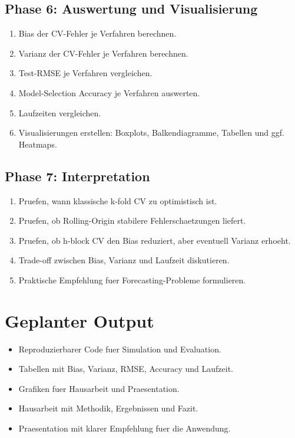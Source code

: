 \documentclass[11pt,a4paper]{article}
\begin{document}
\subsection{Phase 6: Auswertung und Visualisierung}

\begin{enumerate}
  \item Bias der CV-Fehler je Verfahren berechnen.
  \item Varianz der CV-Fehler je Verfahren berechnen.
  \item Test-RMSE je Verfahren vergleichen.
  \item Model-Selection Accuracy je Verfahren auswerten.
  \item Laufzeiten vergleichen.
  \item Visualisierungen erstellen:
  Boxplots, Balkendiagramme, Tabellen und ggf. Heatmaps.
\end{enumerate}

\subsection{Phase 7: Interpretation}

\begin{enumerate}
  \item Pruefen, wann klassische k-fold CV zu optimistisch ist.
  \item Pruefen, ob Rolling-Origin stabilere Fehlerschaetzungen liefert.
  \item Pruefen, ob h-block CV den Bias reduziert, aber eventuell Varianz erhoeht.
  \item Trade-off zwischen Bias, Varianz und Laufzeit diskutieren.
  \item Praktische Empfehlung fuer Forecasting-Probleme formulieren.
\end{enumerate}

\section{Geplanter Output}

\begin{itemize}
  \item Reproduzierbarer Code fuer Simulation und Evaluation.
  \item Tabellen mit Bias, Varianz, RMSE, Accuracy und Laufzeit.
  \item Grafiken fuer Hausarbeit und Praesentation.
  \item Hausarbeit mit Methodik, Ergebnissen und Fazit.
  \item Praesentation mit klarer Empfehlung fuer die Anwendung.
\end{itemize}
\end{document}
